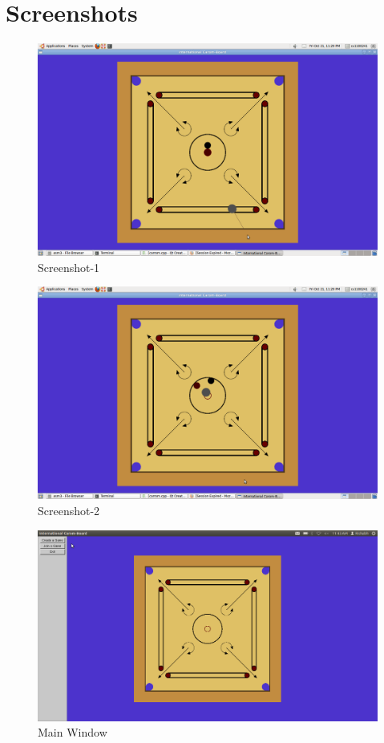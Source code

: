 \documentclass[11pt,a4paper,oneside]{report}
\begin{document}
\section{Screenshots}
\begin{figure}[htp]
\centering
\includegraphics[scale=0.20]{Screenshot}
\caption{Screenshot-1}
\label{fig:Still from game}
\end{figure}

\begin{figure}[htp]
\centering
\includegraphics[scale=0.20]{Screenshot-1}
\caption{Screenshot-2}
\label{fig:Still from game}
\end{figure}

\begin{figure}[htp]
\centering
\includegraphics[scale=0.20]{Screenshot9}
\caption{Main Window}
\label{fig:Still from game}
\end{figure}
\end{document}
